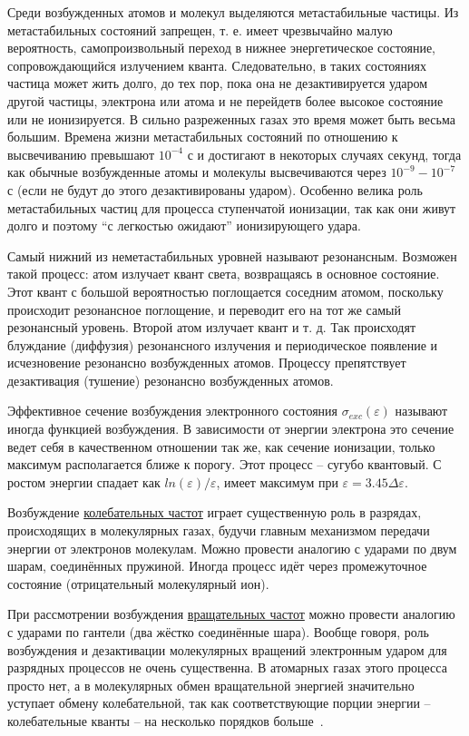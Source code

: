 \documentclass[10pt, a4paper]{article}
\begin{document}
Среди возбужденных атомов и молекул выделяются метастабильные частицы. Из метастабильных состояний запрещен, т. е. имеет чрезвычайно малую вероятность, самопроизвольный переход в нижнее энергетическое состояние, сопровождающийся излучением кванта. Следовательно, в таких состояниях частица может жить долго, до тех пор, пока она не дезактивируется ударом другой частицы, электрона или атома и не перейдетв более высокое состояние или не ионизируется. В сильно разреженных газах это время может быть весьма большим. Времена жизни метастабильных состояний по отношению к высвечиванию превышают $10^{-4}$ с и достигают в некоторых случаях секунд, тогда как обычные возбужденные атомы и молекулы высвечиваются через $10^{-9}-10^{-7}$ с (если не будут до этого дезактивированы ударом). Особенно велика роль метастабильных частиц для процесса ступенчатой ионизации, так как они живут долго и поэтому ``с легкостью ожидают'' ионизирующего удара.

Самый нижний из неметастабильных уровней называют резонансным. Возможен такой процесс: атом излучает квант света, возвращаясь в основное состояние. Этот квант с большой вероятностью поглощается соседним атомом, поскольку происходит резонансное поглощение, и переводит его на тот же самый резонансный уровень. Второй атом излучает квант и т. д. Так происходят блуждание (диффузия) резонансного излучения и периодическое появление и исчезновение резонансно возбужденных атомов. Процессу препятствует дезактивация (тушение) резонансно возбужденных атомов.

Эффективное сечение возбуждения электронного состояния $\sigma_{exc}(\varepsilon)$ называют иногда функцией возбуждения. В зависимости от энергии электрона это сечение ведет себя в качественном отношении так же, как сечение ионизации, только максимум располагается ближе к порогу. Этот процесс -- сугубо квантовый. С ростом энергии спадает как $ln(\varepsilon)/\varepsilon$, имеет максимум при $\varepsilon=3.45 \Delta \varepsilon$.

Возбуждение \uline{колебательных частот} играет существенную роль в разрядах, происходящих в молекулярных газах, будучи главным механизмом передачи энергии от электронов молекулам. Можно провести аналогию с ударами по двум шарам, соединённых пружиной. Иногда процесс идёт через промежуточное состояние (отрицательный молекулярный ион).

При рассмотрении возбуждения \uline{вращательных частот} можно провести аналогию с ударами по гантели (два жёстко соединённые шара). Вообще говоря, роль возбуждения и дезактивации молекулярных вращений электронным ударом для разрядных процессов не очень существенна. В атомарных газах этого процесса просто нет, а в молекулярных обмен вращательной энергией значительно уступает обмену колебательной, так как соответствующие порции энергии -- колебательные кванты -- на несколько порядков больше~\cite{raizer}.
\end{document}

